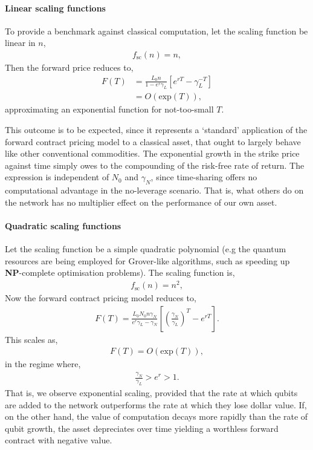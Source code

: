 \documentclass[aps, rmp, twocolumn, amsmath, amssymb, nofootinbib, superscriptaddress, longbibliography, floatfix, table-of-contents, eqsecnum]{revtex4-1}
\begin{document}
%
%

\paragraph{Linear scaling functions}

To provide a benchmark against classical computation, let the scaling function be linear in $n$,
\begin{align}
f_\text{sc}(n) = n,	
\end{align}
Then the forward price reduces to,
\begin{align}
F(T) &= \frac{L_0 n}{1-e^r\gamma_L} \left[e^{rT} - \gamma_L^{-T}\right] \nonumber \\
&= O(\text{exp}(T)),
\end{align}
approximating an exponential function for not-too-small $T$.

This outcome is to be expected, since it represents a `standard' application of the forward contract pricing model to a classical asset, that ought to largely behave like other conventional commodities. The exponential growth in the strike price against time simply owes to the compounding of the risk-free rate of return. The expression is independent of $N_0$ and $\gamma_N$, since time-sharing offers no computational advantage in the no-leverage scenario. That is, what others do on the network has no multiplier effect on the performance of our own asset.

%
%

\paragraph{Quadratic scaling functions}

Let the scaling function be a simple quadratic polynomial (e.g the quantum resources are being employed for Grover-like algorithms, such as speeding up \textbf{NP}-complete optimisation problems). The scaling function is,
\begin{align}
f_\text{sc}(n) = n^2,	
\end{align}
Now the forward contract pricing model reduces to,
\begin{align}
F(T) = \frac{L_0 N_0 n \gamma_N}{e^r\gamma_L-\gamma_N} \left[\left(\frac{\gamma_N}{\gamma_L}\right)^{T} - e^{rT}\right].
\end{align}
This scales as,
\begin{align}
	F(T)=O(\text{exp}(T)),
\end{align}
in the regime where,
\begin{align}
	\frac{\gamma_N}{\gamma_L} > e^r > 1.
\end{align}
That is, we observe exponential scaling, provided that the rate at which qubits are added to the network outperforms the rate at which they lose dollar value. If, on the other hand, the value of computation decays more rapidly than the rate of qubit growth, the asset depreciates over time yielding a worthless forward contract with negative value.
\end{document}
